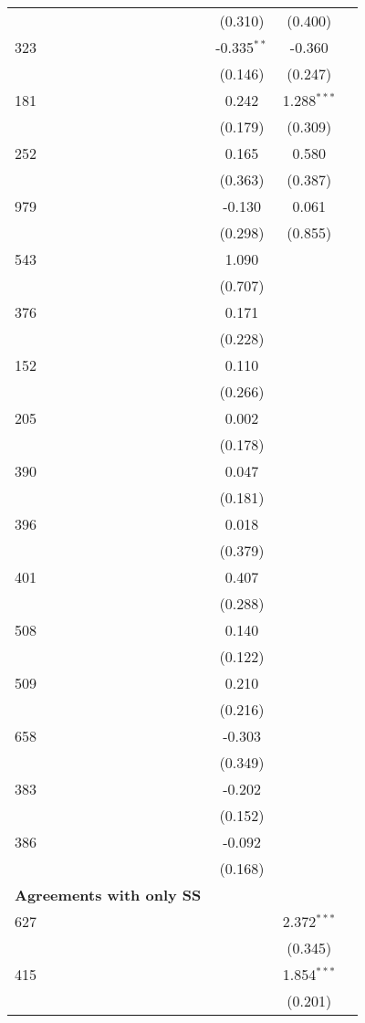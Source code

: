 \begin{table}[htbp]
\begin{adjustbox}{max width=\textwidth}
\begin{tabular}{lccc}
    & (0.310) & (0.400) &  \\
    323 & -0.335$^{\ast\ast}$ & -0.360 &  \\
    & (0.146) & (0.247) &  \\
    181 & 0.242 & 1.288$^{\ast\ast\ast}$ &  \\
    & (0.179) & (0.309) &  \\
    252 & 0.165 & 0.580 &  \\
    & (0.363) & (0.387) &  \\
    979 & -0.130 & 0.061 &  \\
    & (0.298) & (0.855) &  \\
    543 & 1.090 &  &  \\
    & (0.707) &  &  \\
    376 & 0.171 &  &  \\
    & (0.228) &  &  \\
    152 & 0.110 &  &  \\
    & (0.266) &  &  \\
    205 & 0.002 &  &  \\
    & (0.178) &  &  \\
    390 & 0.047 &  &  \\
    & (0.181) &  &  \\
    396 & 0.018 &  &  \\
    & (0.379) &  &  \\
    401 & 0.407 &  &  \\
    & (0.288) &  &  \\
    508 & 0.140 &  &  \\
    & (0.122) &  &  \\
    509 & 0.210 &  &  \\
    & (0.216) &  &  \\
    658 & -0.303 &  &  \\
    & (0.349) &  &  \\
    383 & -0.202 &  &  \\
    & (0.152) &  &  \\
    386 & -0.092 &  &  \\
    & (0.168) &  &  \\
    \hline
    \textbf{Agreements with only SS} &  &  &  \\
    \hline
    627 &  & 2.372$^{\ast\ast\ast}$ &  \\
    &  & (0.345) &  \\
    415   &  & 1.854$^{\ast\ast\ast}$ &  \\
    &  & (0.201) &  \\

\end{tabular}
\end{adjustbox}
\end{table}
